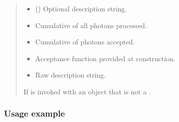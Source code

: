 \documentclass[letterpaper,10pt,english]{sphinxmanual}
\begin{document}
\begin{fulllineitems}
\begin{quote}
\begin{description}
\begin{itemize}
\begin{itemize}
\item {} 
\sphinxAtStartPar
{}  \textendash{} :=  (z\sphinxhyphen{}component of direction).

\end{itemize}

\sphinxAtStartPar
Must return a Boolean array of the same length.
The default is an aperture defined by
.


\item {} 
\sphinxAtStartPar
{} (\sphinxstyleliteralemphasis{\sphinxupquote{ | }}) \textendash{} Optional description string.

\end{itemize}

\begin{itemize}
\item {} 
\sphinxAtStartPar
{} \textendash{} Cumulative  of all photons processed.

\item {} 
\sphinxAtStartPar
{} \textendash{} Cumulative  of photons accepted.

\item {} 
\sphinxAtStartPar
{} \textendash{} Acceptance function provided at construction.

\item {} 
\sphinxAtStartPar
{} \textendash{} Raw description string.

\end{itemize}

\sphinxAtStartPar
{} \textendash{} If  is invoked with an object
that is not a {\hyperref[\detokenize{generated/photon_canon.optics:photon_canon.optics.Photon}]{}}.

\end{description}\end{quote}
\subsubsection*{Usage example}


\end{fulllineitems}
\end{document}
